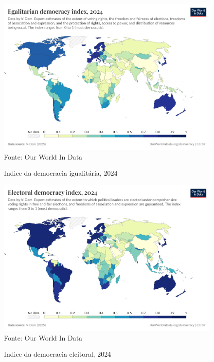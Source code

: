 \begin{figure}[ht]
    \centering
    \caption{Indice da democracia igualitária, 2024}
    \includegraphics[width=1\linewidth]{figuras/democracia/egalitarian-democracy-index-vdem.png}
    \label{fig:egalitarian-democracy-index-vdem}
    \footnotesize{Fonte: Our World In Data}
\end{figure}

\begin{figure}[ht]
    \centering
    \caption{Indice da democracia eleitoral, 2024}
    \includegraphics[width=1\linewidth]{figuras/democracia/electoral-democracy-index.png}
    \label{fig:electoral-democracy-index}
    \footnotesize{Fonte: Our World In Data}
\end{figure}

